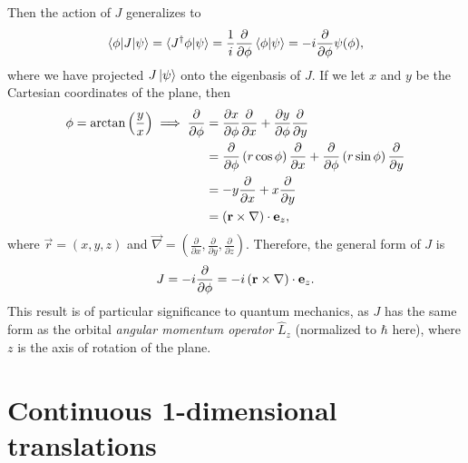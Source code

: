     Then the action of $J$ generalizes to
    \begin{align*}
        \braket{\phi|J|\psi} = \braket{J^\dagger \phi|\psi} = \frac{1}{i}\frac{\partial}{\partial\phi}\braket{\phi|\psi} = -i\frac{\partial}{\partial\phi}\psi(\phi),
    \end{align*}
    where we have projected $J\ket{\psi}$ onto the eigenbasis of $J$. If we let $x$ and $y$ be the Cartesian coordinates of the plane, then
    \begin{align*}
        \phi = \arctan\left(\frac{y}{x}\right) \implies \frac{\partial}{\partial\phi} 
            &= \frac{\partial x}{\partial \phi}\frac{\partial}{\partial x} + \frac{\partial y}{\partial \phi}\frac{\partial}{\partial y} \\
            &= \frac{\partial}{\partial\phi}\left( r\cos\phi \right)\frac{\partial}{\partial x} + \frac{\partial}{\partial\phi}\left( r\sin\phi \right)\frac{\partial}{\partial y} \\
            &= -y\frac{\partial}{\partial x} + x\frac{\partial}{\partial y} \\
            &= (\mathbf{r}\times\mathbf{\nabla})\cdot\mathbf{e}_z,
    \end{align*}
    where $\vec{r} = (x,y,z)$ and $\vec{\nabla} = \left(\frac{\partial}{\partial x},\frac{\partial}{\partial y},\frac{\partial}{\partial z}\right)$. Therefore, the general form of $J$ is
    \begin{align}\label{eq:SO2_J}
        J = -i \frac{\partial}{\partial\phi} = -i \left( \mathbf{r}\times\mathbf{\nabla} \right)\cdot\mathbf{e}_z.
    \end{align}
    This result is of particular significance to quantum mechanics, as $J$ has the same form as the orbital \textit{angular momentum operator} $\hat{L}_z$ (normalized to $\hbar$ here), where $z$ is the axis of rotation of the plane\cite{Hall2013}.
    

    \section{Continuous 1-dimensional translations}


